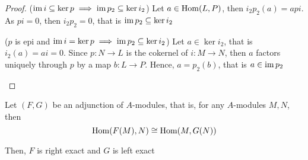 \begin{proof}
	($\operatorname{im} i \subseteq \ker p \implies \operatorname{im} p_2 \subseteq \ker i_2$) Let $a \in \operatorname{Hom}(L, P)$, then $i_2 p_2(a) = api$. As $pi = 0$, then $i_2 p_2 = 0$, that is $\operatorname{im} p_2 \subseteq \ker i_2$
	\begin{center}
	\end{center}
	
	($p$ is epi and $\operatorname{im} i = \ker p \implies \operatorname{im} p_2 \subseteq \ker i_2$) Let $a \in \ker i_2$, that is $i_2(a) = ai = 0$. Since $p: N \to L$ is the cokernel of $i: M \to N$, then $a$ factors uniquely through $p$ by a map $b: L \to P$. Hence, $a = p_2(b)$, that is $a \in \operatorname{im} p_2$
	\begin{center}
	\end{center}
\end{proof}

\begin{proposition}
	Let $(F, G)$ be an adjunction of $A$-modules, that is, for any $A$-modules $M, N$, then 
	$$
		\operatorname{Hom}(F(M), N) \cong \operatorname{Hom}(M, G(N))
	$$

	Then, $F$ is right exact and $G$ is left exact
\end{proposition}

